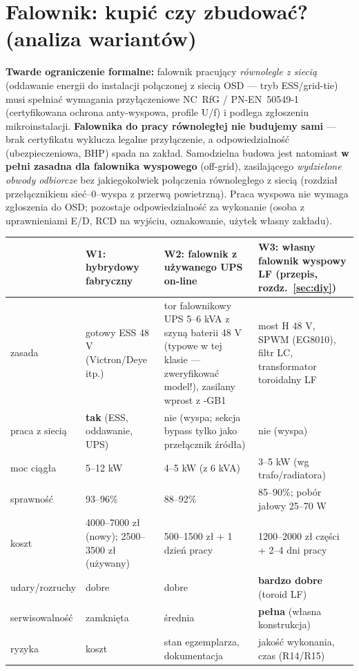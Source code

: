 \documentclass[11pt,a4paper]{article}
\begin{document}
\section{Falownik: kupić czy zbudować? (analiza wariantów)}
\label{sec:falownik}
\textbf{Twarde ograniczenie formalne:} falownik pracujący \emph{równolegle z siecią} (oddawanie
energii do instalacji połączonej z siecią OSD --- tryb ESS/grid-tie) musi spełniać wymagania
przyłączeniowe NC~RfG / PN-EN~50549-1 (certyfikowana ochrona anty-wyspowa, profile U/f) i podlega
zgłoszeniu mikroinstalacji. \textbf{Falownika do pracy równoległej nie budujemy sami} --- brak
certyfikatu wyklucza legalne przyłączenie, a odpowiedzialność (ubezpieczeniowa, BHP) spada na zakład.
Samodzielna budowa jest natomiast \textbf{w pełni zasadna dla falownika wyspowego} (off-grid),
zasilającego \emph{wydzielone obwody odbiorcze} bez jakiegokolwiek połączenia równoległego z siecią
(rozdział przełącznikiem sieć--0--wyspa z przerwą powietrzną). Praca wyspowa nie wymaga zgłoszenia
do OSD; pozostaje odpowiedzialność za wykonanie (osoba z uprawnieniami E/D, RCD na wyjściu,
oznakowanie, użytek własny zakładu).

\begin{longtable}{@{}p{}p{}p{}p{}@{}}
\toprule
 & \textbf{W1: hybrydowy fabryczny} & \textbf{W2: falownik z używanego UPS on-line} & \textbf{W3: własny falownik wyspowy LF (przepis, rozdz.~\ref{sec:diy})}\\
\midrule
zasada & gotowy ESS 48 V (Victron/Deye itp.) & tor falownikowy UPS 5--6 kVA z szyną baterii 48 V (typowe w tej klasie --- zweryfikować model!), zasilany wprost z -GB1 & most H 48 V, SPWM (EG8010), filtr LC, transformator toroidalny LF\\
praca z siecią & \textbf{tak} (ESS, oddawanie, UPS) & nie (wyspa; sekcja bypass tylko jako przełącznik źródła) & nie (wyspa)\\
moc ciągła & 5--12 kW & 4--5 kW (z 6 kVA) & 3--5 kW (wg trafo/radiatora)\\
sprawność & 93--96\% & 88--92\% & 85--90\%; pobór jałowy 25--70 W\\
koszt & 4000--7000 zł (nowy); 2500--3500 zł (używany) & 500--1500 zł + 1 dzień pracy & 1200--2000 zł części + 2--4 dni pracy\\
udary/rozruchy & dobre & dobre & \textbf{bardzo dobre} (toroid LF)\\
serwisowalność & zamknięta & średnia & \textbf{pełna} (własna konstrukcja)\\
ryzyka & koszt & stan egzemplarza, dokumentacja & jakość wykonania, czas (R14/R15)\\
\bottomrule
\end{longtable}
\end{document}
